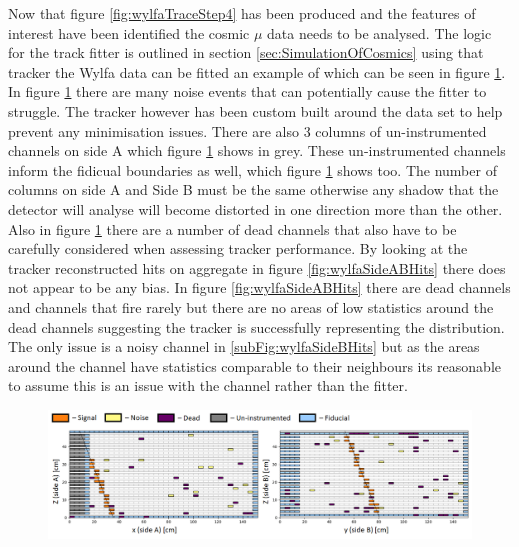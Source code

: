 Now that figure \ref{fig:wylfaTraceStep4} has been produced and the features of interest have been identified the cosmic $\mu$ data needs to be analysed. The logic for the track fitter is outlined in section \ref{sec:SimulationOfCosmics} using that tracker the Wylfa data can be fitted an example of which can be seen in figure \ref{fig:3000ExampleEventWithKey}. In figure \ref{fig:3000ExampleEventWithKey} there are many noise events that can potentially cause the fitter to struggle. The tracker however has been custom built around the data set to help prevent any minimisation issues. There are also 3 columns of un-instrumented channels on side A which figure \ref{fig:3000ExampleEventWithKey} shows in grey. These un-instrumented channels inform the fidicual boundaries as well, which figure \ref{fig:3000ExampleEventWithKey} shows too. The number of columns on side A and Side B must be the same otherwise any shadow that the detector will analyse will become distorted in one direction more than the other. Also in figure \ref{fig:3000ExampleEventWithKey} there are a number of dead channels that also have to be carefully considered when assessing tracker performance. By looking at the tracker reconstructed hits on aggregate in figure \ref{fig:wylfaSideABHits} there does not appear to be any bias. In figure \ref{fig:wylfaSideABHits} there are dead channels and channels that fire rarely but there are no areas of low statistics around the dead channels suggesting the tracker is successfully representing the distribution. The only issue is a noisy channel in \ref{subFig:wylfaSideBHits} but as the areas around the channel have statistics comparable to their neighbours its reasonable to assume this is an issue with the channel rather than the fitter. 

\begin{figure}[htbp]
 \centering
 \includegraphics[width=\linewidth]{Chapter5/Figs/wylfaRasterNew/3000ExampleEventWithKey.png}
 \label{fig:3000ExampleEventWithKey}
\end{figure}

